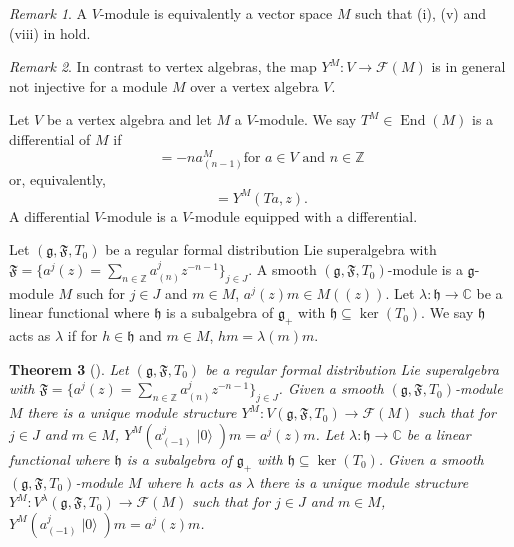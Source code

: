 \documentclass[a4paper, 12pt, reqno]{amsart}
\newtheorem{theorem}{Theorem}[subsection]
\theoremstyle{remark}
\newtheorem{remark}[theorem]{Remark}
\numberwithin{equation}{subsection}
\DeclareMathOperator{\End}{End}
\DeclareMathOperator{\vac}{|0\rangle}
\begin{document}
\begin{remark}
  \label{rmk:18}
  A $V$-module is equivalently a vector space $M$ such that (i), (v) and (viii) in  hold.
\end{remark}

\begin{remark}
  \label{rmk:19}
  In contrast to vertex algebras, the map $Y^M: V \to \mathcal{F}(M)$ is in general not injective for a module $M$ over a vertex algebra $V$.
\end{remark}

Let $V$ be a vertex algebra and let $M$ a $V$-module.
We say  $T^M \in \End(M)$ is a differential of $M$ if
\begin{equation*}
  [T^M, a^M_{(n)}] = -na^M_{(n - 1)} \text{for } a \in V\text{ and }n \in \mathbb{Z}
\end{equation*}
or, equivalently,
\begin{equation*}
  [T^M, Y^M(a, z)] = Y^M(Ta,z).
\end{equation*}
A differential $V$-module is a $V$-module equipped with a differential.

Let $(\mathfrak{g}, \mathfrak{F}, T_0)$ be a regular formal distribution Lie superalgebra with $\mathfrak{F} = \{a^j(z) = \sum_{n \in \mathbb{Z}}a^j_{(n)}z^{-n - 1}\}_{j \in J}$.
A smooth $(\mathfrak{g}, \mathfrak{F}, T_0)$-module is a $\mathfrak{g}$-module $M$ such for $j \in J$ and $m \in M$, $a^j(z)m \in M((z))$.
Let $\lambda: \mathfrak{h} \to \mathbb{C}$ be a linear functional where $\mathfrak{h}$ is a subalgebra of $\mathfrak{g}_+$ with $\mathfrak{h} \subseteq \ker(T_0)$.
We say $\mathfrak{h}$ acts as $\lambda$ if for $h \in \mathfrak{h}$ and $m \in M$, $hm = \lambda(m)m$.


\begin{theorem}[{\cite[Theorem 2.15]{li_vertex_2004}}]
  \label{thr:20}
  Let $(\mathfrak{g}, \mathfrak{F}, T_0)$ be a regular formal distribution Lie superalgebra with $\mathfrak{F} = \{a^j(z) = \sum_{n \in \mathbb{Z}}a^j_{(n)}z^{-n - 1}\}_{j \in J}$.
  Given a smooth $(\mathfrak{g}, \mathfrak{F}, T_0)$-module $M$ there is a unique module structure $Y^M: V(\mathfrak{g}, \mathfrak{F}, T_0) \to \mathcal{F}(M)$ such that for $j \in J$ and $m \in M$, $Y^M(a^j_{(-1)}\vac)m = a^j(z)m$.
  Let $\lambda: \mathfrak{h} \to \mathbb{C}$ be a linear functional where $\mathfrak{h}$ is a subalgebra of $\mathfrak{g}_+$ with $\mathfrak{h} \subseteq \ker(T_0)$.
  Given a smooth $(\mathfrak{g}, \mathfrak{F}, T_0)$-module $M$ where $h$ acts as $\lambda$ there is a unique module structure $Y^M: V^{\lambda}(\mathfrak{g}, \mathfrak{F}, T_0) \to \mathcal{F}(M)$ such that for $j \in J$ and $m \in M$, $Y^M(a^j_{(-1)}\vac)m = a^j(z)m$.
\end{theorem}
\end{document}
